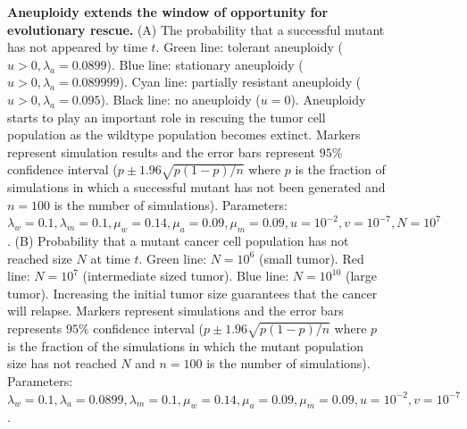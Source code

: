 \documentclass[12pt]{extarticle}
\begin{document}
\begin{figure}
\begin{subfigure}{0.5\textwidth}
\end{subfigure}
\caption{\textbf{Aneuploidy extends the window of opportunity for evolutionary rescue.}
(A) The probability that a successful mutant has not appeared by time $t$. Green line: tolerant aneuploidy ($u>0, \lambda_a=0.0899$). Blue line: stationary aneuploidy ($u>0, \lambda_a=0.089999$). Cyan line: partially resistant aneuploidy ($u>0, \lambda_a=0.095$). Black line: no aneuploidy ($u=0$). Aneuploidy starts to play an important role in rescuing the tumor cell population as the wildtype population becomes extinct. Markers represent simulation results and the error bars represent $95\%$ confidence interval ($p\pm1.96\sqrt{p\left(1-p\right)/n}$ where $p$ is the fraction of simulations in which a successful mutant has not been generated and $n=100$ is the number of simulations). Parameters: $\lambda_w=0.1,\lambda_m=0.1,\mu_w=0.14,\mu_a=0.09,\mu_m=0.09, u=10^{-2}, v=10^{-7},N=10^7$.
(B) Probability that a mutant cancer cell population has not reached size $N$ at time $t$. Green line: $N=10^6$ (small tumor). Red line: $N=10^7$ (intermediate sized tumor). Blue line: $N=10^{10}$ (large tumor). Increasing the initial tumor size guarantees that the cancer will relapse. Markers represent simulations and the error bars represents $95\%$ confidence interval ($p\pm1.96\sqrt{p\left(1-p\right)/n}$ where $p$ is the fraction of the simulations in which the mutant population size has not reached $N$ and $n=100$ is the number of simulations).
Parameters: $\lambda_w=0.1,\lambda_a=0.0899,\lambda_m=0.1,\mu_w=0.14,\mu_a=0.09,\mu_m=0.09, u=10^{-2}, v=10^{-7}$.}
\label{cdffig}
\end{figure}

\end{document}
